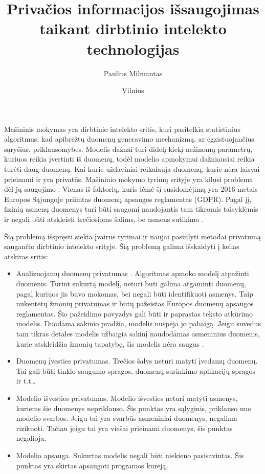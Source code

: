 \documentclass{VUMIFInfBakalaurinis}
\title{Privačios informacijos išsaugojimas taikant dirbtinio intelekto technologijas}
\author{Paulius Milmantas}
\date{Vilnius \\ \the\year}
\begin{document}
\maketitle

\tableofcontents

	\par Mašininis mokymas yra dirbtinio intelekto sritis, kuri pasitelkia statistinius algoritmus, kad apibrėžtų duomenų generavimo mechanizmą, ar egzistuojančius sąryšius, priklausomybes. Modelis dažnai turi didelį kiekį nežinomų parametrų, kuriuos reikia įvertinti iš duomenų, todėl modelio apmokymui dažniausiai reikia turėti daug duomenų. Kai kurie uždaviniai reikalauja duomenų, kurie nėra laisvai prieinami ir yra privatūs. Mašininio mokymo tyrimų srityje yra kilusi problema dėl jų saugojimo \cite{10}. Vienas iš faktorių, kuris lėmė šį susidomėjimą yra 2016 metais Europos Sąjungoje priimtas duomenų apsaugos reglamentas (GDPR). Pagal jį, fizinių asmenų duomenys turi būti saugomi naudojantis tam tikromis taisyklėmis ir negali būti atskleisti trečiosioms šalims, be asmens sutikimo \cite{1}.
	\par Šią problemą išspręsti siekia įvairūs tyrimai ir naujai pasiūlyti metodai privatumą saugančio dirbtinio intelekto srityje. Šią problemą galima išskaidyti į kelias atskiras sritis:
\begin{itemize}
    \item Analizuojamų duomenų privatumas \cite{2}. Algoritmas apmoko modelį atpažinti duomenis. Turint sukurtą modelį, neturi būti galima atgaminti duomenų, pagal kuriuos jis buvo mokomas, bei negali būti identifikuoti asmenys. Taip nukentėtų žmonių privatumas ir būtų pažeistas Europos duomenų apsaugos reglamentas. Šio pažeidimo pavyzdys gali būti ir paprastas teksto atkūrimo modelis. Duodama sakinio pradžia, modelis nuspėja jo pabaigą. Jeigu suvedus tam tikras detales modelis užbaigia sakinį naudodamas asmeninius duomenis, kurie atskleidžia žmonių tapatybę, šis modelis nėra saugus \cite{12}.
    \item Duomenų įvesties privatumas. Trečios šalys neturi matyti įvedamų duomenų. Tai gali būti tinklo saugumo spragos, duomenų surinkimo aplikacijų spragos ir t.t…
    \item Modelio išvesties privatumas. Modelio išvesties neturi matyti asmenys, kuriems šie duomenys nepriklauso. Šis punktas yra sąlyginis, priklauso nuo modelio svarbos. Jeigu tai yra svarbūs asmeniniai duomenys, negalima rizikuoti. Tačiau jeigu tai yra viešai prieinami duomenys, šis punktas negalioja.
    \item Modelio apsauga. Sukurtas modelis negali būti niekieno pasisavintas. Šis punktas yra skirtas apsaugoti programos kūrėją.
\end{itemize}
\end{document}
